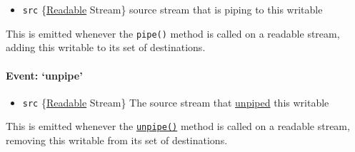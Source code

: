 \begin{itemize}
\itemsep1pt\parskip0pt
\item
  \texttt{src}
  \{\hyperref[streamux5fclassux5fstreamux5freadable]{Readable} Stream\}
  source stream that is piping to this writable
\end{itemize}

This is emitted whenever the \texttt{pipe()} method is called on a
readable stream, adding this writable to its set of destinations.

\begin{Shaded}
\begin{Highlighting}[]
 \NormalTok{();}
 \NormalTok{();}
\NormalTok{(}\NormalTok{, }
  \NormalTok{(}\NormalTok{);}
\NormalTok{\});}
\end{Highlighting}
\end{Shaded}

\paragraph{\texorpdfstring{Event:
`unpipe'}{Event: unpipe}}\label{event-unpipe}

\begin{itemize}
\itemsep1pt\parskip0pt
\item
  \texttt{src}
  \{\hyperref[streamux5fclassux5fstreamux5freadable]{Readable} Stream\}
  The source stream that
  \hyperref[streamux5freadableux5funpipeux5fdestination]{unpiped} this
  writable
\end{itemize}

This is emitted whenever the
\hyperref[streamux5freadableux5funpipeux5fdestination]{\texttt{unpipe()}}
method is called on a readable stream, removing this writable from its
set of destinations.

\begin{Shaded}
\begin{Highlighting}[]
 \NormalTok{();}
 \NormalTok{();}
\NormalTok{(}\NormalTok{, }
  \NormalTok{(}\NormalTok{);}
\NormalTok{\});}
\end{Highlighting}
\end{Shaded}

